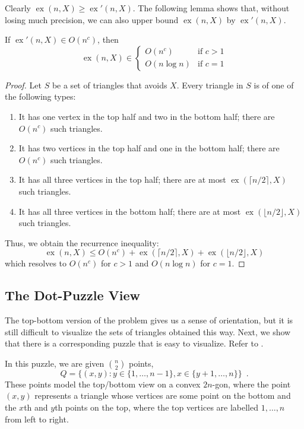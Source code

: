 \documentclass{patmorin}
\DeclareMathOperator{\ex}{ex}
\begin{document}
Clearly $\ex(n,X)\ge\ex'(n,X)$.  The following lemma shows that, without
losing much precision, we can also upper bound $\ex(n,X)$ by $\ex'(n,X)$.

\begin{lem}
  If $\ex'(n,X)\in O(n^c)$, then
  \[
     \ex(n,X)\in 
        \begin{cases} 
            O(n^c)     & \text{if $c>1$} \\
            O(n\log n) & \text{if $c=1$}
        \end{cases}
  \]
\end{lem}

\begin{proof}
   Let $S$ be a set of triangles that avoids $X$.  Every triangle in $S$
   is of one of the following types:
   \begin{enumerate}
      \item It has one vertex in the top half and two in the bottom half;
        there are $O(n^{c})$ such triangles.
      \item It has two vertices in the top half and one in the bottom
        half; there are $O(n^{c})$ such triangles.
      \item It has all three vertices in the top half; there are at most
        $\ex(\lceil n/2\rceil,X)$ such triangles.
      \item It has all three vertices in the bottom half; there are at
        most $\ex(\lfloor n/2\rfloor,X)$ such triangles.
   \end{enumerate}
   Thus, we obtain the recurrence inequality:
   \[  \ex(n,X) \le O(n^{c}) + \ex(\lceil n/2\rceil,X) + \ex(\lfloor n/2\rfloor,X) \]
   which resolves to $O(n^c)$ for $c>1$ and $O(n\log n)$ for $c=1$.
\end{proof}


\subsection{The Dot-Puzzle View}

The top-bottom version of the problem gives us a sense of orientation,
but it is still difficult to visualize the sets of triangles obtained
this way. Next, we show that there is a corresponding puzzle that is
easy to visualize.  Refer to .  

In this puzzle, we are given $\binom{n}{2}$ points,
\[
    Q = \{(x,y): y\in\{1,\ldots,n-1\}, x\in\{y+1,\ldots,n\} \} \enspace .
\]
These points model the top/bottom view on a convex $2n$-gon, where the
point $(x,y)$ represents a triangle whose vertices are some point on
the bottom and the $x$th and $y$th points on the top, where the top
vertices are labelled $1,\ldots,n$ from left to right.
\end{document}
